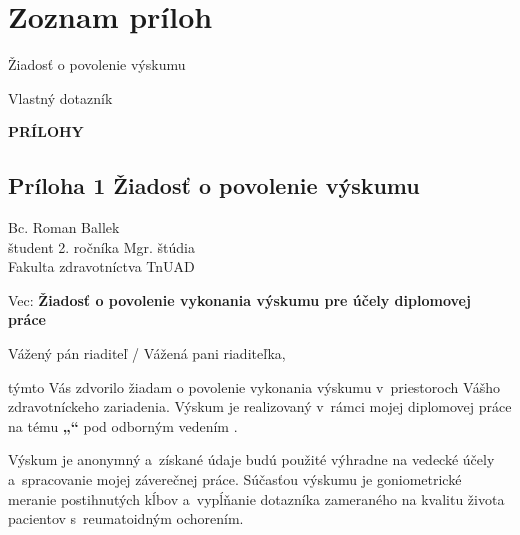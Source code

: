 \chapter*{Zoznam príloh}

\begin{description}[leftmargin=3cm, labelsep=0.5cm]
    \item[Príloha 1] Žiadosť o povolenie výskumu
    \item[Príloha 2] Vlastný dotazník
\end{description}

\clearpage

\vspace*{7cm}
\begin{center}
    \Huge\textbf{PRÍLOHY}
\end{center}
\thispagestyle{empty}
\clearpage

\section*{Príloha 1 Žiadosť o povolenie výskumu}

\vspace{1cm}
\begin{flushright}
    Bc. Roman Ballek\\
    študent 2. ročníka Mgr. štúdia\\
    Fakulta zdravotníctva TnUAD
\end{flushright}

\vspace{1cm}
\noindent Vec: \textbf{Žiadosť o povolenie vykonania výskumu pre účely diplomovej práce}

\vspace{1cm}
\noindent Vážený pán riaditeľ / Vážená pani riaditeľka,

\vspace{0.5cm}
\noindent týmto Vás zdvorilo žiadam o povolenie vykonania výskumu v~priestoroch Vášho zdravotníckeho zariadenia. Výskum je realizovaný v~rámci mojej diplomovej práce na tému \textbf{„\nazovprace“} pod odborným vedením \veduci.

\vspace{0.5cm}
\noindent Výskum je anonymný a~získané údaje budú použité výhradne na vedecké účely a~spracovanie mojej záverečnej práce. Súčasťou výskumu je goniometrické meranie postihnutých kĺbov a~vypĺňanie dotazníka zameraného na kvalitu života pacientov s~reumatoidným ochorením.

